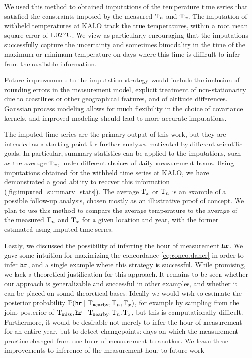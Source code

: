 \documentclass[12pt]{article}
\begin{document}
We used this method to obtained imputations of the temperature time series that satisfied the constraints imposed by the measured \(\Tn\) and \(\Tx\).
The imputation of withheld temperatures at KALO track the true temperatures, within a root mean square error of \(1.02\,\degreeC\).
We view as particularly encouraging that the imputations successfully capture the uncertainty and sometimes bimodality in the time of the maximum or minimum temperature on days where this time is difficult to infer from the available information.

Future improvements to the imputation strategy would include the inclusion of rounding errors in the measurement model, explicit treatment of non-stationarity due to coastlines or other geographical features, and of altitude differences.
Gaussian process modeling allows for much flexibility in the choice of covariance kernels, and improved modeling should lead to more accurate imputations.

The imputed time series are the primary output of this work, but they are intended as a starting point for further analyses motivated by different scientific goals.
In particular, summary statistics can be applied to the imputations, such as the average \(\Tx\), under different choices of daily measurement hours.
Using imputations obtained for the withheld time series at KALO, we have demonstrated a good ability to recover this information (\autoref{fig:imputed_summary_stats}).
The average \(\Tx\) or \(\Tn\) is an example of a possible follow-up analysis, chosen mostly as an illustrative proof of concept.
We plan to use this method to compare the average temperature to the average of the measured \(\Tn\) and \(\Tx\) for a given location and year, with the former estimated using imputed time series.

Lastly, we discussed the possibility of inferring the hour of measurement \(\hour\).
We gave some intuition for maximizing the concordance \autoref{eq:concordance} in order to infer \(\hour\), and a single example where this strategy is successful.
While promising, we lack a theoretical justification for this approach.
It remains to be seen whether our approach is generalizable and successful in other examples, and whether it can be placed on sound theoretical bases.
Ideally we would wish to estimate the posterior probability \(\Pr\del{\hour \mid \T_\obs,\Tn,\Tx}\), for example by sampling from the joint posterior of \(\T_\miss, \hour \mid \T_\obs,\)\(\Tn\),\(\Tx\), but this is computationally difficult.
Furthermore, it would be desirable not merely to infer the hour of measurement for an entire year, but to detect changepoints: days on which the measurement practice changed from one hour of measurement to another.
We leave these improvements to inference of the measurement hour to future work.
\end{document}
